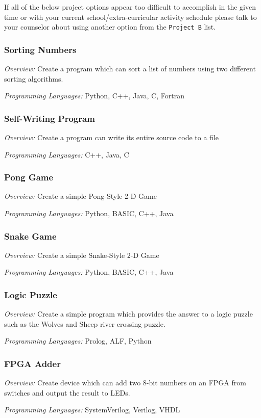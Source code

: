       If all of the below project options appear too difficult to accomplish in the given time or with your current
        school/extra-curricular activity schedule please talk to your counselor about using another option from 
        the \texttt{Project B} list.

      \subsubsection{Sorting Numbers}
      \label{sssec:sorting_nums}

        \textit{Overview:} Create a  program which can sort a list of numbers using two different sorting algorithms.

        \textit{Programming Languages:} Python, C++, Java, C, Fortran

      \subsubsection{Self-Writing Program}
      \label{sssec:self-writing_program}

        \textit{Overview:} Create a program can write its entire source code to a file

        \textit{Programming Languages:} C++, Java, C

      \subsubsection{Pong Game}
      \label{sssec:pong_game}

        \textit{Overview:} Create a simple Pong-Style 2-D Game

        \textit{Programming Languages:} Python, BASIC, C++, Java

      \subsubsection{Snake Game}
      \label{sssec:snake_game}

        \textit{Overview:} Create a simple Snake-Style 2-D Game

        \textit{Programming Languages:} Python, BASIC, C++, Java

      \subsubsection{Logic Puzzle}
      \label{sssec:logic_puzzle}

        \textit{Overview:} Create a simple program which provides the answer to a logic puzzle such as the Wolves and Sheep
          river crossing puzzle.

        \textit{Programming Languages:} Prolog, ALF, Python

      \subsubsection{FPGA Adder}
      \label{sssec:fpga_adder}

        \textit{Overview:} Create device which can add two 8-bit numbers on an FPGA from switches and output the result to LEDs.

        \textit{Programming Languages:} SystemVerilog, Verilog, VHDL